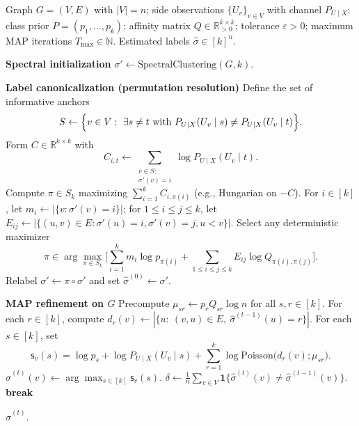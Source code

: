 \documentclass[11pt]{article}
\theoremstyle{plain}
\theoremstyle{definition}
\begin{document}
\begin{algorithm}[H]
  \caption{Iterative spectral initialization and MAP refinement (no-split variant used in the simulations)}
  \label{alg:iterative2}
  \begin{algorithmic}[1]
    \Require
      Graph $G=(V,E)$ with $|V|=n$;
      side observations $\{U_v\}_{v\in V}$ with channel $P_{U\mid X}$;
      class prior $P=(p_1,\dots,p_k)$;
      affinity matrix $Q\in\mathbb{R}_{>0}^{k\times k}$;
      tolerance $\varepsilon>0$;
      maximum MAP iterations $T_{\max}\in\mathbb{N}$.
    \Ensure Estimated labels $\widehat\sigma\in[k]^n$.

    \State \textbf{Spectral initialization}
    \State $\sigma' \gets \mathrm{SpectralClustering}(G, k)$.

    \State \textbf{Label canonicalization (permutation resolution)}
    \State Define the set of informative anchors
      \[
        S \gets \Bigl\{ v\in V:\ \exists  s\neq t\ \text{with}\ P_{U\mid X}(U_v\mid s)\neq P_{U\mid X}(U_v\mid t)\Bigr\}.
      \]
     
       \State Form $C\in\mathbb{R}^{k\times k}$ with
         \[
           C_{i,t} \gets \sum_{\substack{v\in S:\\ \sigma'(v)=i}} \log P_{U\mid X}(U_v \mid t).
         \]
       \State Compute $\pi\in S_k$ maximizing $\sum_{i=1}^k C_{i,\pi(i)}$ (e.g., Hungarian on $-C$).
    \Else {}
       \State For $i\in[k]$, let $m_i \gets |\{v:\sigma'(v)=i\}|$;\quad
              for $1\le i\le j\le k$, let
              $E_{ij}\gets |\{(u,v)\in E:\sigma'(u)=i, \sigma'(v)=j, u<v\}|$.
       \State Select any deterministic maximizer
         \[
           \pi \in \arg\max_{\pi\in S_k}
           \Biggl[
             \sum_{i=1}^k m_i \log p_{\pi(i)}
             + \sum_{1\le i\le j\le k} E_{ij} \log Q_{\pi(i), \pi(j)}
           \Biggr].
         \]
    \EndIf
    \State Relabel $\sigma' \gets \pi\circ\sigma'$ and set $\widehat\sigma^{(0)}\gets\sigma'$.

    \State \textbf{MAP refinement on $G$}
    \State Precompute $\mu_{sr} \gets p_r Q_{sr} \log n$ for all $s,r\in[k]$.
        \State For each $r\in[k]$, compute
               $d_r(v) \gets |\{ u:\ (v,u)\in E,\ \widehat\sigma^{(t-1)}(u)=r \}|$.
        \State For each $s\in[k]$, set
          \[
            \mathsf{s}_v(s)
            =
            \log p_s
            + \log P_{U\mid X}(U_v\mid s)
            + \sum_{r=1}^k \log \mathrm{Poisson}\bigl(d_r(v);\mu_{sr}\bigr).
          \]
        \State $\widehat\sigma^{(t)}(v) \gets \arg\max_{s\in[k]} \mathsf{s}_v(s)$.
      \EndFor
      \State $\delta \gets \frac{1}{n}\sum_{v\in V}\mathbf{1}\{\widehat\sigma^{(t)}(v)\neq \widehat\sigma^{(t-1)}(v)\}$.
      \If{$\delta<\varepsilon$} \textbf{break} \EndIf
    \EndFor

    \State \Return $\widehat\sigma^{(t)}$.
  \end{algorithmic}
\end{algorithm}
\end{document}
